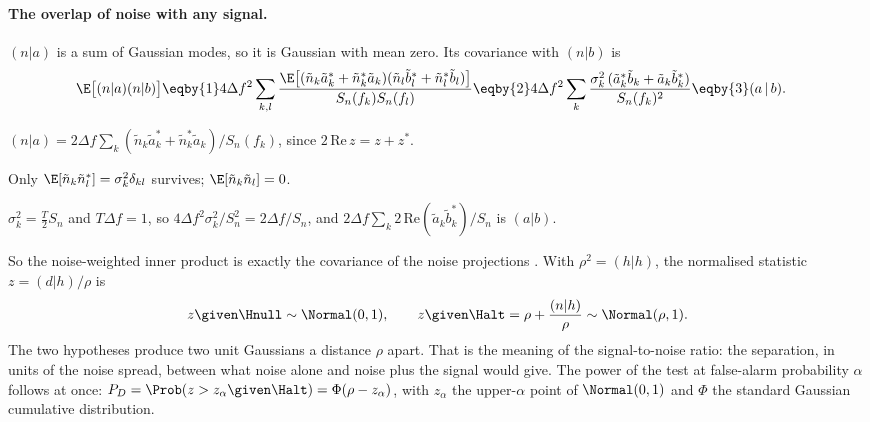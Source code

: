 \paragraph{The overlap of noise with any signal.} $(n|a)$ is a sum of Gaussian modes, so it is Gaussian with mean
zero. Its covariance with $(n|b)$ is
\begin{align}
  \E\big[(n|a)(n|b)\big]
  &\eqby{1}4\Delta f^2\sum_{k,l}\frac{\E\big[(\tilde n_k\tilde a_k^*+\tilde n_k^*\tilde a_k)(\tilde n_l\tilde b_l^*+\tilde n_l^*\tilde b_l)\big]}{S_n(f_k)S_n(f_l)}
   \eqby{2}4\Delta f^2\sum_k\frac{\sigma_k^2\,(\tilde a_k^*\tilde b_k+\tilde a_k\tilde b_k^*)}{S_n(f_k)^2}
   \eqby{3}(a\,|\,b).
  \label{10b:eq:noise-overlap}
\end{align}
\begin{explain}
  \item $(n|a)=2\Delta f\sum_k(\tilde n_k\tilde a_k^*+\tilde n_k^*\tilde a_k)/S_n(f_k)$, since $2\,\mathrm{Re}\,z=z+z^*$.
  \item Only $\E[\tilde n_k\tilde n_l^*]=\sigma_k^2\delta_{kl}$ survives; $\E[\tilde n_k\tilde n_l]=0$.
  \item $\sigma_k^2=\tfrac T2S_n$ and $T\Delta f=1$, so $4\Delta f^2\sigma_k^2/S_n^2=2\Delta f/S_n$, and
        $2\Delta f\sum_k2\,\mathrm{Re}(\tilde a_k\tilde b_k^*)/S_n$ is $(a|b)$.
\end{explain}
So the noise-weighted inner product is exactly the covariance of the noise projections
\cite[eq.~(8)]{CutlerFlanagan1994}. With $\rho^2=(h|h)$, the normalised statistic $z=(d|h)/\rho$ is
\begin{equation}
  z\given\Hnull\sim\Normal(0,1),\qquad z\given\Halt=\rho+\frac{(n|h)}{\rho}\sim\Normal(\rho,1).
  \label{10b:eq:z-dist}
\end{equation}
The two hypotheses produce two unit Gaussians a distance $\rho$ apart. That is the meaning of the signal-to-noise
ratio: the separation, in units of the noise spread, between what noise alone and noise plus the signal would give.
The power of the test at false-alarm probability $\alpha$ follows at once:
$P_D=\Prob(z>z_\alpha\given\Halt)=\Phi(\rho-z_\alpha)$, with $z_\alpha$ the upper-$\alpha$ point of $\Normal(0,1)$
and $\Phi$ the standard Gaussian cumulative distribution.

